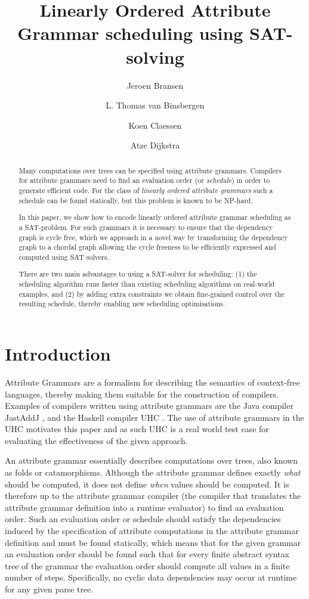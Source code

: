 \documentclass{llncs}
\title{Linearly Ordered Attribute Grammar scheduling using SAT-solving}
\author{Jeroen Bransen\inst{1}  \and L. Thomas van Binsbergen\inst{2,1} \and Koen Claessen\inst{3} \and Atze Dijkstra\inst{1}}
\institute{Utrecht University, Utrecht, The Netherlands, \email{\{J.Bransen,atze\}@uu.nl}
\and Royal Holloway, University of London, Egham, UK, \email{ltvanbinsbergen@acm.org}
\and Chalmers University of Technology, Gothenburg, Sweden, \email{koen@chalmers.se}}
\begin{document}
\maketitle

\begin{abstract}
Many computations over trees can be specified using attribute
grammars. Compilers for attribute grammars need to find an evaluation
order (or {\em schedule}) in order to generate efficient code. For the class
of {\em linearly ordered attribute grammars} such a schedule can be found
statically, but this problem is known to be NP-hard.

In this paper, we show how to encode linearly ordered attribute grammar
scheduling as a SAT-problem. For such grammars it is necessary to ensure that the dependency graph is cycle free, which we approach in a novel way by transforming the dependency graph to a chordal graph allowing the cycle freeness to be efficiently expressed and computed using SAT solvers.

There are two main advantages to using a SAT-solver for scheduling:
(1) the scheduling algorithm runs faster than existing scheduling
algorithms on real-world examples, and (2) by adding extra constraints
we obtain fine-grained control over the resulting schedule, thereby
enabling new scheduling optimisations.


\end{abstract}

\section{Introduction}
Attribute Grammars \cite{knuth68} are a formalism for describing the semantics of context-free languages, thereby making them suitable for the construction of compilers. Examples of compilers written using attribute grammars are the Java compiler JastAddJ \cite{Ekman:2007}, and the Haskell compiler UHC \cite{Dijkstra:2009}. The use of attribute grammars in the UHC motivates this paper and as such UHC is a real world test case for evaluating the effectiveness of the given approach.

An attribute grammar essentially describes computations over trees, also known as folds or catamorphisms. Although the attribute grammar defines exactly \emph{what} should be computed, it does not define \emph{when} values should be computed. It is therefore up to the attribute grammar compiler (the compiler that translates the attribute grammar definition into a runtime evaluator) to find an evaluation order. Such an evaluation order or schedule should satisfy the dependencies induced by the specification of attribute computations in the attribute grammar definition and must be found statically, which means that for the given grammar an evaluation order should be found such that for every finite abstract syntax tree of the grammar the evaluation order should compute all values in a finite number of steps. Specifically, no cyclic data dependencies may occur at runtime for any given parse tree.
\end{document}
